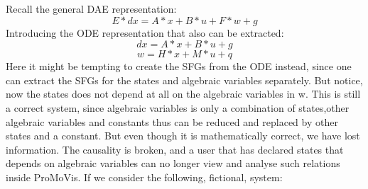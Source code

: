Recall the general DAE representation:
\begin{equation}
E*dx = A*x + B*u + F*w + g
\end{equation}Introducing the ODE representation that also can be extracted:
\begin{equation}
dx = A*x + B*u + g
\end{equation}
\begin{equation}
w  = H*x + M*u + q
\end{equation}\newline Here it might be tempting to create the SFGs from the ODE instead, since one can extract the SFGs  for the states and algebraic variables separately. But notice, now the states does not depend at all on the algebraic variables in w. This is still a correct system, since algebraic variables is only a combination of states,other algebraic variables and constants thus can be reduced and replaced by other states and a constant. But even though it is mathematically correct, we have lost information. The causality is broken, and a user that has declared states that depends on algebraic variables can no longer view and analyse such relations inside ProMoVis. If we consider the following, fictional, system:

